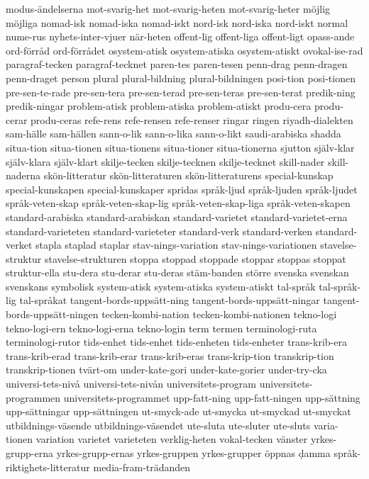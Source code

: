 {modus-ändelserna
mot-svarig-het
mot-svarig-heten
mot-svarig-heter
möjlig
möjliga
nomad-isk
nomad-iska
nomad-iskt
nord-isk
nord-iska
nord-iskt
normal
nume-rus
nyhets-inter-vjuer
när-heten
offent-lig
offent-liga
offent-ligt
opass-ande
ord-förråd
ord-förrådet
osystem-atisk
osystem-atiska
osystem-atiskt
ovokal-ise-rad
paragraf-tecken
paragraf-tecknet
paren-tes
paren-tesen
penn-drag
penn-dragen
penn-draget
person
plural
plural-bildning
plural-bildningen
posi-tion
posi-tionen
pre-sen-te-rade
pre-sen-tera
pre-sen-terad
pre-sen-teras
pre-sen-terat
predik-ning
predik-ningar
problem-atisk
problem-atiska
problem-atiskt
produ-cera
produ-cerar
produ-ceras
refe-rens
refe-rensen
refe-renser
ringar
ringen
riyadh-dialekten
sam-hälle
sam-hällen
sann-o-lik
sann-o-lika
sann-o-likt
saudi-arabiska
shadda
situa-tion
situa-tionen
situa-tionens
situa-tioner
situa-tionerna
sjutton
själv-klar
själv-klara
själv-klart
skilje-tecken
skilje-tecknen
skilje-tecknet
skill-nader
skill-naderna
skön-litteratur
skön-litteraturen
skön-litteraturens
special-kunskap
special-kunskapen
special-kunskaper
spridas
språk-ljud
språk-ljuden
språk-ljudet
språk-veten-skap
språk-veten-skap-lig
språk-veten-skap-liga
språk-veten-skapen
standard-arabiska
standard-arabiskan
standard-varietet
standard-varietet-erna
standard-varieteten
standard-varieteter
standard-verk
standard-verken
standard-verket
stapla
staplad
staplar
stav-nings-variation
stav-nings-variationen
stavelse-struktur
stavelse-strukturen
stoppa
stoppad
stoppade
stoppar
stoppas
stoppat
struktur-ella
stu-dera
stu-derar
stu-deras
stäm-banden
större
svenska
svenskan
svenskans
symbolisk
system-atisk
system-atiska
system-atiskt
tal-språk
tal-språk-lig
tal-språkat
tangent-bords-uppsätt-ning
tangent-bords-uppsätt-ningar
tangent-bords-uppsätt-ningen
tecken-kombi-nation
tecken-kombi-nationen
tekno-logi
tekno-logi-ern
tekno-logi-erna
tekno-login
term
termen
terminologi-ruta
terminologi-rutor
tids-enhet
tids-enhet
tids-enheten
tids-enheter
trans-krib-era
trans-krib-erad
trans-krib-erar
trans-krib-eras
trans-krip-tion
transkrip-tion
transkrip-tionen
tvärt-om
under-kate-gori
under-kate-gorier
under-try-cka
universi-tets-nivå
universi-tets-nivån
universitets-program
universitets-programmen
universitets-programmet
upp-fatt-ning
upp-fatt-ningen
upp-sättning
upp-sättningar
upp-sättningen
ut-smyck-ade
ut-smycka
ut-smyckad
ut-smyckat
utbildnings-väsende
utbildnings-väsendet
ute-sluta
ute-sluter
ute-sluts
varia-tionen
variation
varietet
varieteten
verklig-heten
vokal-tecken
vänster
yrkes-grupp-erna
yrkes-grupp-ernas
yrkes-gruppen
yrkes-grupper
öppnas
ḍamma
språk-riktighets-litteratur
media-fram-trädanden
}
